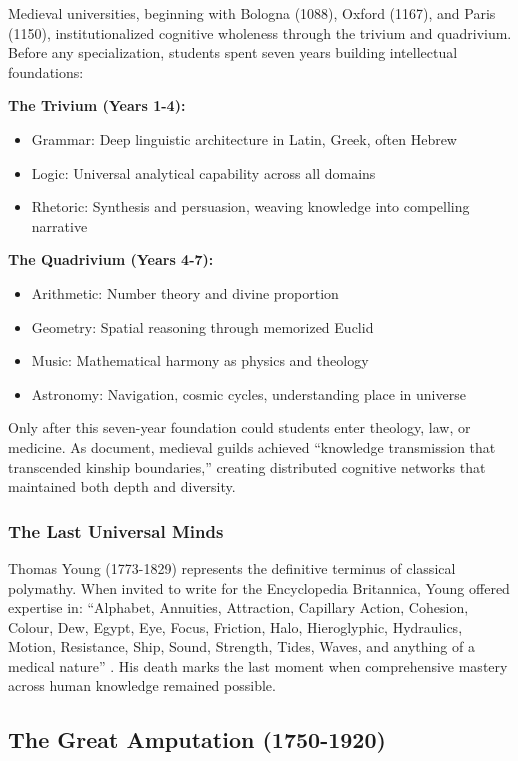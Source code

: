 Medieval universities, beginning with Bologna (1088), Oxford (1167), and Paris (1150), institutionalized cognitive wholeness through the trivium and quadrivium. Before any specialization, students spent seven years building intellectual foundations:

\textbf{The Trivium (Years 1-4):}
\begin{itemize}
\item Grammar: Deep linguistic architecture in Latin, Greek, often Hebrew
\item Logic: Universal analytical capability across all domains
\item Rhetoric: Synthesis and persuasion, weaving knowledge into compelling narrative
\end{itemize}

\textbf{The Quadrivium (Years 4-7):}
\begin{itemize}
\item Arithmetic: Number theory and divine proportion
\item Geometry: Spatial reasoning through memorized Euclid
\item Music: Mathematical harmony as physics and theology
\item Astronomy: Navigation, cosmic cycles, understanding place in universe
\end{itemize}

Only after this seven-year foundation could students enter theology, law, or medicine. As \citet{delacroix2018} document, medieval guilds achieved ``knowledge transmission that transcended kinship boundaries,'' creating distributed cognitive networks that maintained both depth and diversity.

\subsubsection{The Last Universal Minds}

Thomas Young (1773-1829) represents the definitive terminus of classical polymathy. When invited to write for the Encyclopedia Britannica, Young offered expertise in: ``Alphabet, Annuities, Attraction, Capillary Action, Cohesion, Colour, Dew, Egypt, Eye, Focus, Friction, Halo, Hieroglyphic, Hydraulics, Motion, Resistance, Ship, Sound, Strength, Tides, Waves, and anything of a medical nature'' \citep{robinson2006}. His death marks the last moment when comprehensive mastery across human knowledge remained possible.

\subsection{The Great Amputation (1750-1920)}

